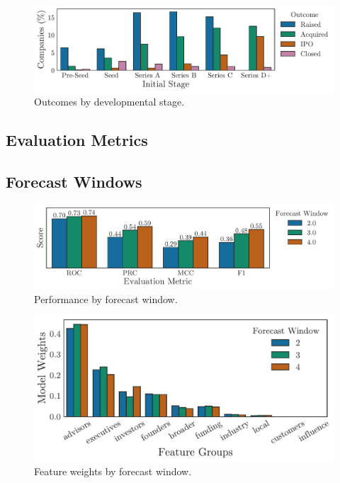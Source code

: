 \documentclass[../thesis/thesis.tex]{subfiles}
\begin{document}
\begin{figure}[!htb]
    \centering
    \includegraphics[width=\textwidth]{../figures/evaluation/outcomes_stage}
    \caption[Outcomes by developmental stage]{Outcomes by developmental stage.}
    \label{fig:evaluation:outcome_stage}
\end{figure}

\subsection{Evaluation Metrics}


\subsection{Forecast Windows}



\begin{figure}[!htb]
    \centering
    \includegraphics[width=\textwidth]{../figures/evaluation/performance_window}
    \caption[Performance by forecast window]{Performance by forecast window.}
    \label{fig:evaluation:performance_window}
\end{figure}


\begin{figure}[!htb]
    \centering
    \includegraphics[width=\textwidth]{../figures/evaluation/features_window}
    \caption[Feature weights by forecast window]{Feature weights by forecast window.}
    \label{fig:evaluation:feature_groups_window}
\end{figure}
\end{document}
